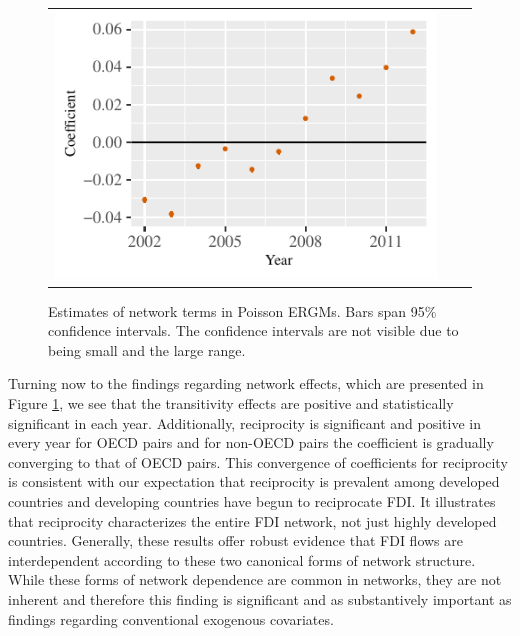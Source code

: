 \documentclass[reqno,onecolumn,letterpaper,12pt]{article}
\begin{document}
\begin{figure}[!h]
\begin{tabular}{@{\hskip -.05cm}c@{\hskip -.2cm}c@{\hskip -.2cm}c}
\includegraphics[height=.165\textheight, clip=true, trim=.5cm .5cm 0cm .1cm]{figures/main_rl_plots/Mutuality_notOECD.pdf} \\
\end{tabular}
\caption{\label{fig:net_effects} Estimates of network terms in Poisson ERGMs. Bars span 95\% confidence intervals. The confidence intervals are not visible due to being small and the large range.}
\end{figure}

Turning now to the findings regarding network effects, which are presented in Figure \ref{fig:net_effects}, we see that the transitivity effects are positive and statistically significant in each year. Additionally, reciprocity is significant and positive in every year for OECD pairs and for non-OECD pairs the coefficient is gradually converging to that of OECD pairs. This convergence of coefficients for reciprocity is consistent with our expectation that reciprocity is prevalent among developed countries and developing countries have begun to reciprocate FDI. %
It illustrates %
that reciprocity characterizes the entire FDI network, not just highly developed countries. Generally, these results offer robust evidence that FDI flows are interdependent according to these two canonical forms of network structure. While these forms of network dependence are common in networks, they are not inherent and therefore this finding is significant and as substantively important as findings regarding conventional exogenous covariates.
\end{document}
